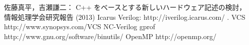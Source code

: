 \begin{thebibliography}{99}
   佐藤真平，吉瀬謙二：
   C++ をベースとする新しいハードウェア記述の検討，
   情報処理学会研究報告 (2013)
   Icarus Verilog: http://iverilog.icarus.com/ .
   VCS http://www.synopsys.com/VCS
   NC-Verilog
   gprof http://www.gnu.org/software/binutils/
   OpenMP http://openmp.org/
\end{thebibliography}
